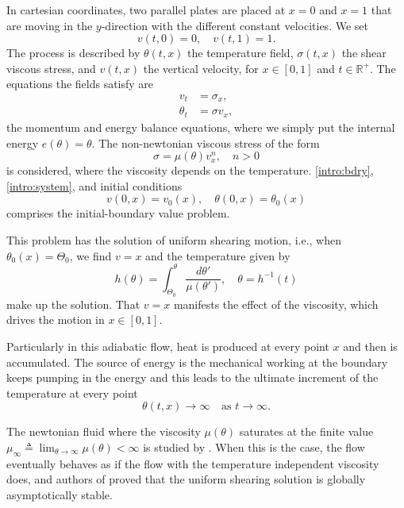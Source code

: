 \documentclass[a4paper,11pt]{article}
\begin{document}
In cartesian coordinates, two parallel plates are placed at $x=0$ and $x=1$ that are moving in the $y$-direction with the different constant velocities. We set 
\begin{equation}
 v(t,0)=0, \quad v(t,1)=1. \label{intro:bdry}
\end{equation}
The process is described by $\theta(t,x)$ the temperature field, $\sigma(t,x)$ the shear viscous stress, and $v(t,x)$ the vertical velocity, for $x\in[0,1]$ and $t\in \mathbb{R}^+$. The equations the fields satisfy are
\begin{equation} \label{intro:system}
\begin{aligned}
 v_t &= \sigma_x,\\
 \theta_t &= \sigma v_x,
\end{aligned}
\end{equation}
the momentum and energy balance equations, where we simply put the internal energy $e(\theta)=\theta$. The non-newtonian viscous stress of the form 
$$ \sigma = \mu(\theta) v_x^n, \quad n>0$$
is considered, where the viscosity depends on the temperature. \eqref{intro:bdry}, \eqref{intro:system}, and initial conditions
$$ v(0,x) = v_0(x), \quad \theta(0,x)=\theta_0(x)$$
comprises the initial-boundary value problem.

This problem has the solution of uniform shearing motion, i.e., when $\theta_0(x)=\Theta_0$, we find $v=x$ and the temperature given by
$$ h(\theta) = \int_{\Theta_0}^\theta \frac{d\theta'}{\mu(\theta')}, \quad \theta = h^{-1}(t)$$
make up the solution. That $v=x$ manifests the effect of the viscosity, which drives the motion in $x\in[0,1]$.

Particularly in this adiabatic flow, heat is produced at every point $x$ and then is accumulated. The source of energy is the mechanical working at the boundary keeps pumping in the energy and this leads to the ultimate increment of the temperature at every point
\begin{equation}\label{intro:h} \theta(t,x) \rightarrow \infty \quad \text{as $t \rightarrow \infty$.} \end{equation}

The newtonian fluid where the viscosity $\mu(\theta)$ saturates at the finite value $\mu_\infty\triangleq \lim_{\theta \rightarrow \infty} \mu(\theta) < \infty$ is studied by \cite{dafermos_adiabatic_1983}. When this is the case, the flow eventually behaves as if the flow with the temperature independent viscosity does, and authors of \cite{dafermos_adiabatic_1983} proved that the uniform shearing solution is globally asymptotically stable.
\end{document}
